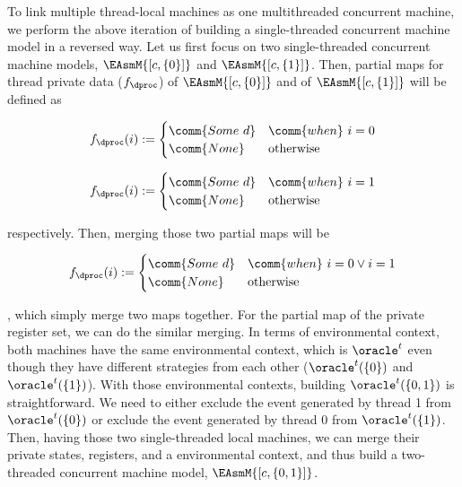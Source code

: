 To link multiple thread-local machines as one multithreaded concurrent machine,  
we perform the above iteration of building a single-threaded concurrent machine model in a reversed way.
Let us first focus on two single-threaded concurrent machine models, 
$\EAsmM{[c, \{0\}]}$ and $\EAsmM{[c, \{1\}]}$.
Then, partial maps for thread private data ($f_\dproc$) of $\EAsmM{[c, \{0\}]}$ 
and of $\EAsmM{[c, \{1\}]}$ will be defined as\newline
\noindent
\begin{minipage}[t]{.5\textwidth}
\begin{small}
\[
f_{\dproc}(i):=
\begin{cases}
 \comm{Some \ d} & \comm{when} \ i = 0\\
\comm{None} & \text{otherwise}
\end{cases}
\]
\end{small}
\end{minipage}
\begin{minipage}[t]{.5\textwidth}
\begin{small}
\[
f_{\dproc}(i):=
\begin{cases}
 \comm{Some \ d} & \comm{when} \ i = 1\\
\comm{None} & \text{otherwise}
\end{cases}
\]
\end{small}
\end{minipage}
respectively.
Then, merging those two partial maps will be 
\begin{small}
\[
f_{\dproc}(i):=
\begin{cases}
 \comm{Some \ d} & \comm{when} \ i = 0 \vee i = 1\\
\comm{None} & \text{otherwise}
\end{cases}
\]
\end{small}
, which simply merge two maps together. 
For the partial map of the private register set, we can do the similar merging.
In terms of environmental context, both machines have the same environmental context, which is 
$\oracle^{t}$ even though they have different strategies from each other ($\oracle^{t}(\{0\})$ and $\oracle^{t}(\{1\})$).
With those environmental contexts, 
building $\oracle^{t}(\{0, 1\})$ is straightforward. 
We need to either  exclude the event generated by thread 1 from $\oracle^{t}(\{0\})$ or 
exclude the event generated by thread 0 from $\oracle^{t}(\{1\})$.
Then, having those two single-threaded local machines, we can merge their private states, registers, and a environmental context, 
and thus build a two-threaded concurrent machine model, $\EAsmM{[c, \{0, 1\}]}$.
